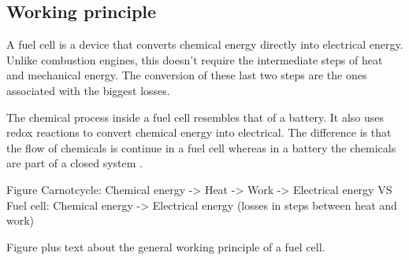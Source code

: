 \subsection{Working principle}
A fuel cell is a device that converts chemical energy directly into electrical energy. Unlike combustion engines, this doesn't require the intermediate steps of heat and mechanical energy. The conversion of these last two steps are the ones associated with the biggest losses.

The chemical process inside a fuel cell resembles that of a battery. It also uses redox reactions to convert chemical energy into electrical. The difference is that the flow of chemicals is continue in a fuel cell whereas in a battery the chemicals are part of a closed system \cite{EPA2008a}.

Figure Carnotcycle: Chemical energy -> Heat -> Work -> Electrical energy VS Fuel cell: Chemical energy -> Electrical energy (losses in steps between heat and work)

Figure plus text about the general working principle of a fuel cell.

